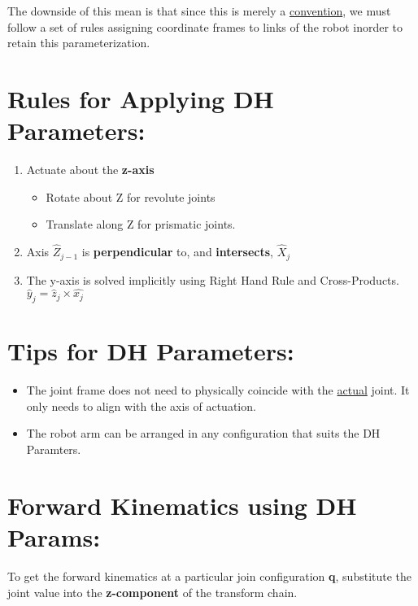 \documentclass[12px]{article}
\begin{document}
\noindent The downside of this mean is that since this is merely a \underline{convention}, we must follow a set of rules assigning coordinate frames to links of the robot inorder to retain this parameterization.


\section*{Rules for Applying DH Parameters:}


\begin{enumerate}
    \item Actuate about the \textbf{z-axis}
    \begin{itemize}
        \item Rotate about Z for revolute joints
        \item Translate along Z for prismatic joints.
    \end{itemize}

    \item Axis $\hat{Z}_{j-1} $ is \textbf{perpendicular} to, and \textbf{intersects}, $\hat{X}_{j}$

    \item The y-axis is solved implicitly using Right Hand Rule and Cross-Products. $\hat{y}_j = \hat{z}_j \times \hat{x_j}$

\end{enumerate}


\section*{Tips for DH Parameters:}

\begin{itemize}
    \item The joint frame does not need to physically coincide with the \underline{actual} joint. It only needs to align with the axis of actuation.
    \item The robot arm can be arranged in any configuration that suits the DH Paramters.
\end{itemize}


\section*{Forward Kinematics using DH Params:}

To get the forward kinematics at a particular join configuration \textbf{q}, substitute the joint value into the \textbf{z-component} of the transform chain.
\end{document}
